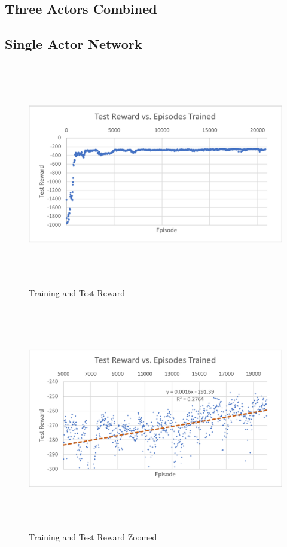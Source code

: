 \subsection{Three Actors Combined}


\subsection{Single Actor Network}
\begin{figure}[H]
	\includegraphics[width=6in, height=3.85in, keepaspectratio]{figures/train_figs/all_r.pdf}
	\caption{Training and Test Reward} \label{fig:all_r}
\end{figure}
\begin{figure}[H]
	\includegraphics[width=6in, height=3.85in, keepaspectratio]{figures/train_figs/all_rzoom.pdf}
	\caption{Training and Test Reward Zoomed} \label{fig:all_rzoom}
\end{figure}
